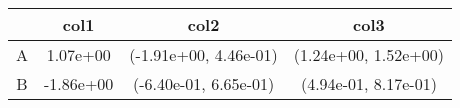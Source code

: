 \begin{tabular}{cccc}
\toprule
&col1&col2&col3\tabularnewline
\midrule
A&1.07e+00& (-1.91e+00, 4.46e-01)& (1.24e+00, 1.52e+00)\tabularnewline
B&-1.86e+00& (-6.40e-01, 6.65e-01)& (4.94e-01, 8.17e-01)\tabularnewline
\bottomrule
\end{tabular}
